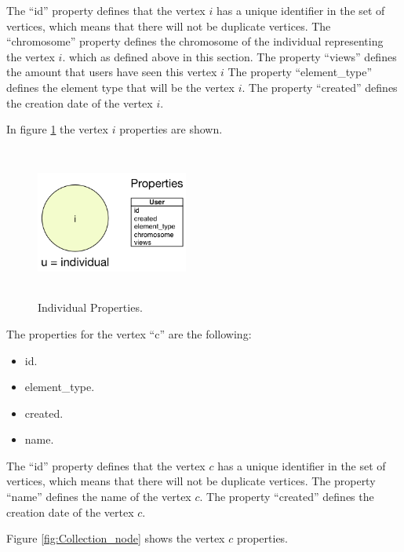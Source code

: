 The “id” property defines that the vertex $i$ has a unique identifier in the set
of vertices, which means that there will not be duplicate vertices. The
“chromosome” property defines the chromosome of the individual representing the
vertex $i$. which as defined above in this section. The property “views” defines
the amount that users have seen this vertex $i$ The property “element\_type”
defines the element type that will be the vertex $i$. The property “created”
defines the creation date of the vertex $i$.



In figure \ref{fig:Individual_node} the vertex $i$ properties are shown.

\begin{figure}
\captionsetup{justification=centering,margin=2cm}
\centering
\setlength\fboxsep{0pt}
\setlength\fboxrule{0.7pt}
\includegraphics[width=5cm,height=5cm,keepaspectratio]{img/individual_node.png}
\caption{Individual Properties.}
\label{fig:Individual_node}
\end{figure}

The properties for the vertex “c” are the following:

\begin{itemize}
\item id.
\item element\_type.
\item created.
\item name.
\end{itemize}

The “id” property defines that the vertex $c$ has a unique identifier in the set
of vertices, which means that there will not be duplicate vertices. The
property “name” defines the name of the vertex $c$. The property “created”
defines the creation date of the vertex $c$.

Figure \ref{fig:Collection_node} shows the vertex $c$ properties.

